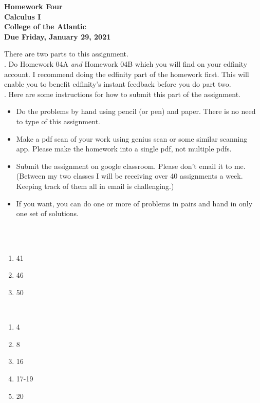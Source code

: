 \documentclass[12pt]{article}
\begin{document}
\pagestyle{empty}
 
\begin{center}
{\LARGE {\bf Homework Four}}\\
\bigskip
{\Large {\bf Calculus I}}\\
\bigskip
{\Large {\bf College of the Atlantic}}\\
\bigskip
{ {\bf Due Friday, January 29, 2021}}\\ 
\end{center}
\medskip


\noindent There are two parts to this assignment.\\

.  Do Homework 04A \emph{and} Homework
04B which you will find on your edfinity account.  I recommend doing
the edfinity part of the homework first.  This will enable you to
benefit edfinity's instant feedback before you do part two.\\ 


.  Here are some
instructions for how to submit this part of the assignment.
\begin{itemize}
\item Do the problems by hand using pencil (or pen) and paper.
  There is no need to type of this assignment.
\item Make a pdf scan of your work using genius scan or some
  similar scanning app.  Please make the homework into a single
  pdf, not multiple pdfs.
\item Submit the assignment on google classroom.  Please don't
  email it to me.  (Between my two classes I will be receiving
  over 40 assignments a week.  Keeping track of them all in email
  is challenging.)
\item If you want, you can do one or more of problems in pairs and hand 
  in only one set of solutions.\\
\end{itemize}


\hspace{2mm}\\

\\
\begin{enumerate}
\setlength{\itemsep}{-1mm}
\item 41
\item 46
\item 50
\end{enumerate}

\\
\begin{enumerate}
\setlength{\itemsep}{-1mm}
\item 4
\item 8
\item 16
\item 17-19
\item 20
\end{enumerate}
\end{document}
